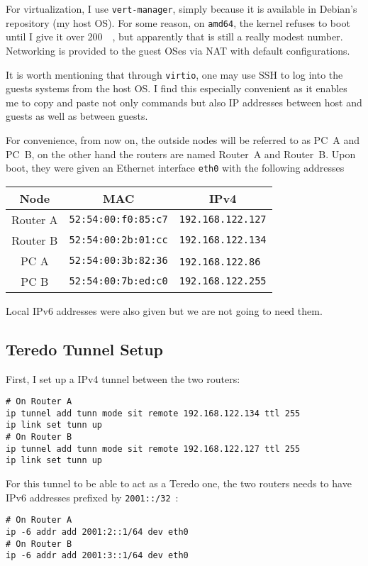\documentclass[a4paper,12pt]{article}
\newcommand{\byte}{\mathrm{B}}
\begin{document}
For virtualization, I use \verb|vert-manager|, simply because it is available
in Debian's repository (my host OS).  For some reason, on \verb|amd64|,
the kernel refuses to boot until I give it over \SI{200}{\mega\byte},
but apparently that is still a really modest number.  Networking is provided
to the guest OSes via NAT with default configurations.

It is worth mentioning that through \verb|virtio|, one may use SSH to log into
the guests systems from the host OS.  I find this especially convenient as
it enables me to copy and paste not only commands but also IP addresses between
host and guests as well as between guests.

For convenience, from now on, the outside nodes will be referred to as PC~A and
PC~B, on the other hand the routers are named Router~A and Router~B.  Upon boot,
they were given an Ethernet interface \verb|eth0| with the following addresses
\begin{center}
  \begin{tabular}{c c c}
    \toprule
    Node & MAC & IPv4\\
    \midrule
    Router A & \verb|52:54:00:f0:85:c7| & \verb|192.168.122.127|\\
    Router B & \verb|52:54:00:2b:01:cc| & \verb|192.168.122.134|\\
    PC A & \verb|52:54:00:3b:82:36| & \verb|192.168.122.86|\,\,\,\\
    PC B & \verb|52:54:00:7b:ed:c0| & \verb|192.168.122.255|\\
    \bottomrule
  \end{tabular}
\end{center}

Local IPv6 addresses were also given but we are not going to need them.

\subsection{Teredo Tunnel Setup}
First, I set up a IPv4 tunnel between the two routers:
\begin{verbatim}
# On Router A
ip tunnel add tunn mode sit remote 192.168.122.134 ttl 255
ip link set tunn up
# On Router B
ip tunnel add tunn mode sit remote 192.168.122.127 ttl 255
ip link set tunn up
\end{verbatim}

For this tunnel to be able to act as a Teredo one, the two routers needs
to have IPv6 addresses prefixed by \verb|2001::/32|~\cite{rfc4380}:
\begin{verbatim}
# On Router A
ip -6 addr add 2001:2::1/64 dev eth0
# On Router B
ip -6 addr add 2001:3::1/64 dev eth0
\end{verbatim}
\end{document}
